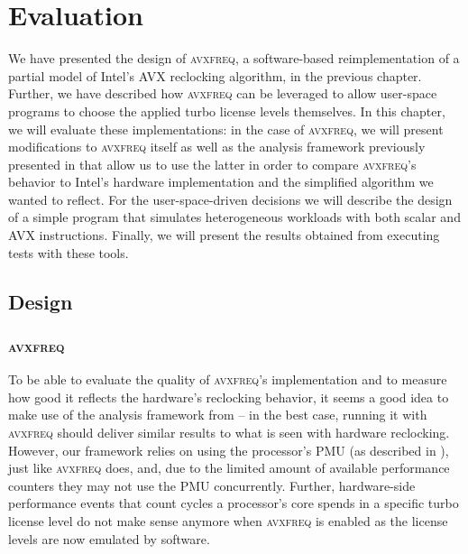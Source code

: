 \chapter{Evaluation}
\label{sec:evaluation}

We have presented the design of \textsc{avxfreq}, a software-based reimplementation of a partial model of Intel's \gls{AVX} reclocking algorithm, in the previous chapter. Further, we have described how \textsc{avxfreq} can be leveraged to allow user-space programs to choose the applied turbo license levels themselves. In this chapter, we will evaluate these implementations: in the case of \textsc{avxfreq}, we will present modifications to \textsc{avxfreq} itself as well as the analysis framework previously presented in  that allow us to use the latter in order to compare \textsc{avxfreq}'s behavior to Intel's hardware implementation and the simplified algorithm we wanted to reflect. For the user-space-driven decisions we will describe the design of a simple program that simulates heterogeneous workloads with both scalar and \gls{AVX} instructions. Finally, we will present the results obtained from executing tests with these tools.

\section{Design}
\label{sec:evaluation:design}


\subsection{\textsc{avxfreq}}
\label{sec:evaluation:design:avxfreq}

To be able to evaluate the quality of \textsc{avxfreq}'s implementation and to measure how good it reflects the hardware's reclocking behavior, it seems a good idea to make use of the analysis framework from  -- in the best case, running it with \textsc{avxfreq} should deliver similar results to what is seen with hardware reclocking. However, our framework relies on using the processor's \gls{PMU} (as described in ), just like \textsc{avxfreq} does, and, due to the limited amount of available performance counters they may not use the \gls{PMU} concurrently. Further, hardware-side performance events that count cycles a processor's core spends in a specific turbo license level do not make sense anymore when \textsc{avxfreq} is enabled as the license levels are now emulated by software.

